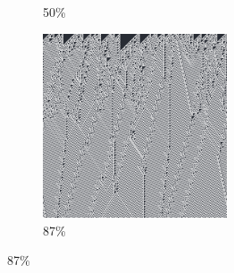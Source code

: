 \documentclass[12pt, fleqn]{report}                             %
\theoremstyle{break}                                            %
\begin{document}
\begin{figure}[ht!]
\begin{subfigure}[b]{0.4\linewidth}
          \caption{50\%}
        \end{subfigure}
        \begin{subfigure}[b]{0.4\linewidth}
          \includegraphics[width=0.6\textwidth]{Images/110/d.png}
          \caption{87\%}
        \end{subfigure}
      \end{figure}
\end{document}
